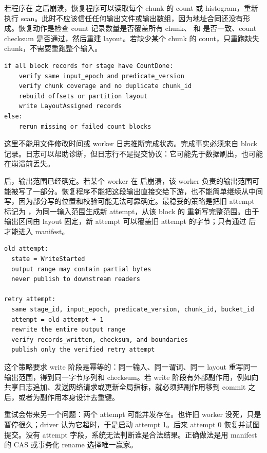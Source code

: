 若程序在  之后崩溃，恢复程序可以读取每个 chunk 的 count 或 histogram，重新执行 scan。此时不应该信任任何输出文件或输出数组，因为地址合同还没有形成。恢复动作是检查 count 记录数量是否覆盖所有 chunk、 和  是否一致、count checksum 是否通过，然后重建 layout。若缺少某个 chunk 的 count，只重跑缺失 chunk，不需要重跑整个输入。

\begin{lstlisting}[numbers=none,caption={CountDone 后恢复 scan 的判定}]
if all block records for stage have CountDone:
    verify same input_epoch and predicate_version
    verify chunk coverage and no duplicate chunk_id
    rebuild offsets or partition layout
    write LayoutAssigned records
else:
    rerun missing or failed count blocks
\end{lstlisting}

这里不能用文件修改时间或 worker 日志推断完成状态。完成事实必须来自 block 记录。日志可以帮助诊断，但日志行不是提交协议：它可能先于数据刷出，也可能在崩溃前丢失。

 后，输出范围已经确定。若某个 worker 在  后崩溃，该 worker 负责的输出范围可能被写了一部分。恢复程序不能把这段输出直接交给下游，也不能简单继续从中间写，因为部分写的位置和校验可能无法可靠确定。最稳妥的策略是把旧 attempt 标记为 ，为同一输入范围生成新 attempt，从该 block 的  重新写完整范围。由于输出区间由 layout 固定，新 attempt 可以覆盖旧 attempt 的字节；只有通过  后才能进入 manifest。

\begin{lstlisting}[numbers=none,caption={WriteStarted 崩溃后的重试策略}]
old attempt:
  state = WriteStarted
  output range may contain partial bytes
  never publish to downstream readers

retry attempt:
  same stage_id, input_epoch, predicate_version, chunk_id, bucket_id
  attempt = old attempt + 1
  rewrite the entire output range
  verify records_written, checksum, and boundaries
  publish only the verified retry attempt
\end{lstlisting}

这个策略要求 write 阶段是幂等的：同一输入、同一谓词、同一 layout 重写同一输出范围，得到同一字节序列和 checksum。若 write 阶段有外部副作用，例如向共享日志追加、发送网络请求或更新全局指标，就必须把副作用移到 commit 之后，或者为副作用本身设计去重键。

重试会带来另一个问题：两个 attempt 可能并发存在。也许旧 worker 没死，只是暂停很久；driver 认为它超时，于是启动 attempt 1。后来 attempt 0 恢复并试图提交。没有 attempt 字段，系统无法判断谁是合法结果。正确做法是用 manifest 的 CAS 或事务化 rename 选择唯一赢家。

